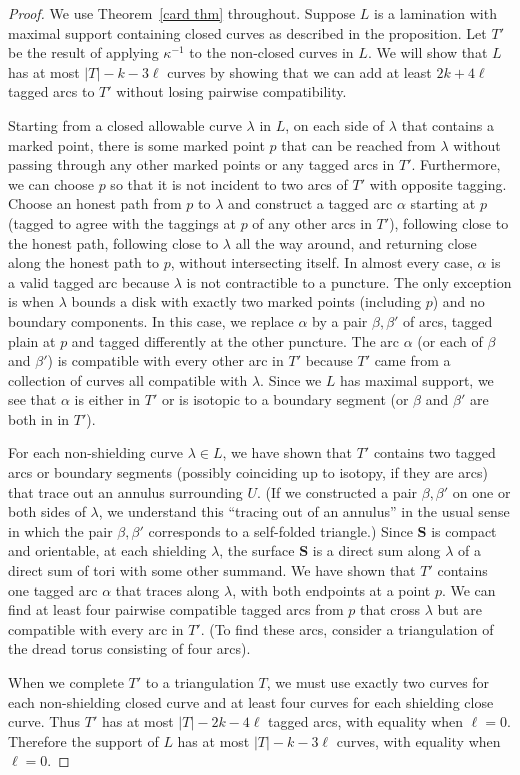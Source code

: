 \documentclass{amsart}
\theoremstyle{definition}
\theoremstyle{remark}
\numberwithin{equation}{section}
\newcommand{\0}{{\mathbf{0}}}
\renewcommand{\S}{\mathbf{S}}
\begin{document}
\begin{proof}
We use Theorem~\ref{card thm} throughout.
Suppose $L$ is a lamination with maximal support containing closed curves as described in the proposition.
Let $T'$ be the result of applying $\kappa^{-1}$ to the non-closed curves in $L$.
We will show that $L$ has at most $|T|-k-3\ell$ curves by showing that we can add at least $2k+4\ell$ tagged arcs to $T'$ without losing pairwise compatibility.

Starting from a closed allowable curve $\lambda$ in $L$, on each side of $\lambda$ that contains a marked point, there is some marked point $p$ that can be reached from $\lambda$ without passing through any other marked points or any tagged arcs in $T'$.
Furthermore, we can choose $p$ so that it is not incident to two arcs of $T'$ with opposite tagging.
Choose an honest path from $p$ to $\lambda$ and construct a tagged arc $\alpha$ starting at $p$ (tagged to agree with the taggings at $p$ of any other arcs in $T'$), following close to the honest path, following close to $\lambda$ all the way around, and returning close along the honest path to $p$, without intersecting itself.
In almost every case, $\alpha$ is a valid tagged arc because $\lambda$ is not contractible to a puncture.
The only exception is when $\lambda$ bounds a disk with exactly two marked points (including $p$) and no boundary components.
In this case, we replace $\alpha$ by a pair $\beta,\beta'$ of arcs, tagged plain at $p$ and tagged differently at the other puncture.
The arc $\alpha$ (or each of $\beta$ and $\beta'$) is compatible with every other arc in $T'$ because $T'$ came from a collection of curves all compatible with $\lambda$.
Since we $L$ has maximal support, we see that $\alpha$ is either in $T'$ or is isotopic to a boundary segment (or $\beta$ and $\beta'$ are both in in $T'$).

For each non-shielding curve $\lambda\in L$, we have shown that $T'$ contains two tagged arcs or boundary segments (possibly coinciding up to isotopy, if they are arcs) that trace out an annulus surrounding $U$.
(If we constructed a pair $\beta,\beta'$ on one or both sides of $\lambda$, we understand this ``tracing out of an annulus'' in the usual sense in which the pair $\beta,\beta'$ corresponds to a self-folded triangle.)
Since $\S$ is compact and orientable, at each shielding $\lambda$, the surface $\S$ is a direct sum along $\lambda$ of a direct sum of tori with some other summand.
We have shown that $T'$ contains one tagged arc $\alpha$ that traces along $\lambda$, with both endpoints at a point $p$.
We can find at least four pairwise compatible tagged arcs from $p$ that cross $\lambda$ but are compatible with every arc in $T'$.
(To find these arcs, consider a triangulation of the dread torus consisting of four arcs).

When we complete $T'$ to a triangulation $T$, we must use exactly two curves for each non-shielding closed curve and at least four curves for each shielding close curve.
Thus $T'$ has at most $|T|-2k-4\ell$ tagged arcs, with equality when $\ell=0$.
Therefore the support of $L$ has at most $|T|-k-3\ell$ curves, with equality when $\ell=0$.
\end{proof}
\end{document}
